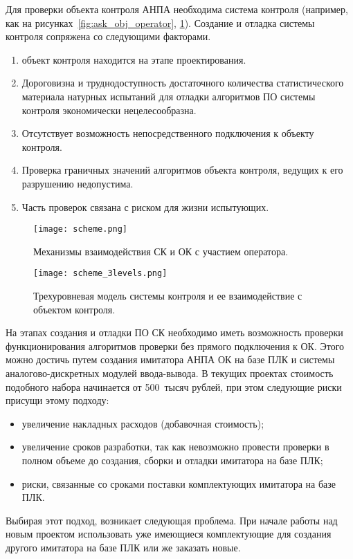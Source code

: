 Для проверки объекта контроля АНПА необходима система контроля (например, как на рисунках~\ref{fig:ask_obj_operator}, \ref{fig:ask_obj_operator_3}).
Создание и отладка системы контроля сопряжена со следующими факторами.
\begin{enumerate}
    \item объект контроля находится на этапе проектирования.
    \item Дороговизна и труднодоступность достаточного количества статистического материала
    натурных испытаний для отладки алгоритмов ПО системы контроля экономически нецелесообразна.
    \item Отсутствует возможность непосредственного подключения к объекту контроля.
    \item Проверка граничных значений алгоритмов объекта контроля, ведущих к его разрушению недопустима.
    \item Часть проверок связана с риском для жизни испытующих.
\end{enumerate}
\begin{center}
    \begin{figure}[hb!]
        \texttt{[image: scheme.png]}
        \caption[Взаимодействие СК и ОК]
            {Механизмы взаимодействия СК и ОК с участием оператора.}
                \label{fig:ask_obj_operator}
        \texttt{[image: scheme\_3levels.png]}
        \caption[Взаимодействие СК и ОК]
            {Трехуровневая модель системы контроля и ее взаимодействие с объектом контроля.}
                \label{fig:ask_obj_operator_3}
    \end{figure}
\end{center}
На этапах создания и отладки ПО СК необходимо иметь возможность проверки
функционирования алгоритмов проверки без прямого подключения к ОК.
Этого можно достичь путем создания имитатора АНПА ОК на базе ПЛК и системы аналогово-дискретных
модулей ввода-вывода.
В текущих проектах стоимость подобного набора начинается от 500~тысяч рублей,
при этом следующие риски присущи этому подходу:
\begin{itemize}
    \item увеличение накладных расходов (добавочная стоимость);
    \item увеличение сроков разработки, так как невозможно провести проверки в полном объеме до 
        создания, сборки и отладки имитатора на базе ПЛК;
    \item риски, связанные со сроками поставки комплектующих имитатора на базе ПЛК.
\end{itemize}
Выбирая этот подход, возникает следующая проблема.
При начале работы над новым проектом использовать уже имеющиеся комплектующие для создания другого имитатора на базе ПЛК или же заказать новые.


